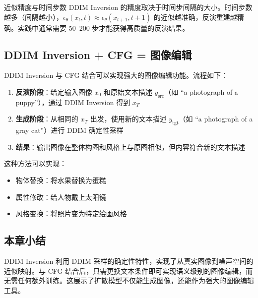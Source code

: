 \begin{knowledgebox}{近似精度与时间步数}
DDIM Inversion 的精度取决于时间步间隔的大小。时间步数越多（间隔越小），$\epsilon_\theta(x_t, t) \approx \epsilon_\theta(x_{t+1}, t+1)$ 的近似越准确，反演重建越精确。实践中通常需要 50--200 步才能获得高质量的反演结果。
\end{knowledgebox}

\subsection{DDIM Inversion + CFG = 图像编辑}

DDIM Inversion 与 CFG 结合可以实现强大的图像编辑功能。流程如下：

\begin{enumerate}
    \item \textbf{反演阶段}：给定输入图像 $x_0$ 和原始文本描述 $y_{\text{src}}$（如 ``a photograph of a puppy''），通过 DDIM Inversion 得到 $x_T$
    \item \textbf{生成阶段}：从相同的 $x_T$ 出发，使用新的文本描述 $y_{\text{tgt}}$（如 ``a photograph of a gray cat''）进行 DDIM 确定性采样
    \item \textbf{结果}：输出图像在整体构图和风格上与原图相似，但内容符合新的文本描述
\end{enumerate}

这种方法可以实现：
\begin{itemize}
    \item 物体替换：将水果替换为蛋糕
    \item 属性修改：给人物戴上太阳镜
    \item 风格变换：将照片变为特定绘画风格
\end{itemize}

\subsection{本章小结}

DDIM Inversion 利用 DDIM 采样的确定性特性，实现了从真实图像到噪声空间的近似映射。与 CFG 结合后，只需更换文本条件即可实现语义级别的图像编辑，而无需任何额外训练。这展示了扩散模型不仅能生成图像，还能作为强大的图像编辑工具。

\newpage
